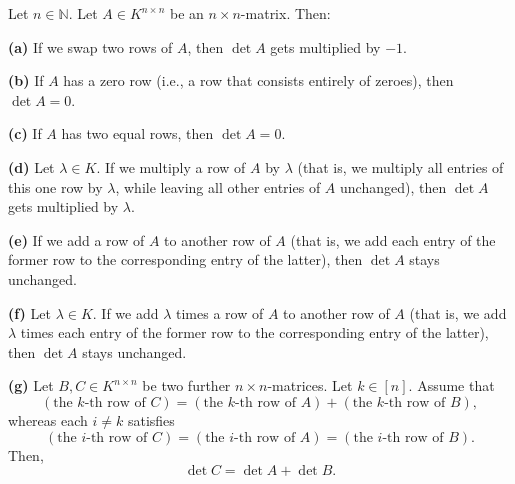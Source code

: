 \begin{theorem}
\label{thm.det.rowop}Let $n\in\mathbb{N}$. Let $A\in
K^{n\times n}$ be an $n\times n$-matrix. Then: \medskip

\textbf{(a)} If we swap two rows of $A$, then $\det A$ gets multiplied by
$-1$. \medskip

\textbf{(b)} If $A$ has a zero row (i.e., a row that consists entirely of
zeroes), then $\det A=0$. \medskip

\textbf{(c)} If $A$ has two equal rows, then $\det A=0$. \medskip

\textbf{(d)} Let $\lambda\in K$. If we multiply a row of $A$ by $\lambda$
(that is, we multiply all entries of this one row by $\lambda$, while leaving
all other entries of $A$ unchanged), then $\det A$ gets multiplied by
$\lambda$. \medskip

\textbf{(e)} If we add a row of $A$ to another row of $A$ (that is, we add
each entry of the former row to the corresponding entry of the latter), then
$\det A$ stays unchanged. \medskip

\textbf{(f)} Let $\lambda\in K$. If we add $\lambda$ times a row of $A$ to
another row of $A$ (that is, we add $\lambda$ times each entry of the former
row to the corresponding entry of the latter), then $\det A$ stays unchanged.
\medskip

\textbf{(g)} Let $B,C\in K^{n\times n}$ be two further $n\times n$-matrices.
Let $k\in\left[  n\right]  $. Assume that%
\[
\left(  \text{the }k\text{-th row of }C\right)  =\left(  \text{the }k\text{-th
row of }A\right)  +\left(  \text{the }k\text{-th row of }B\right)  ,
\]
whereas each $i\neq k$ satisfies%
\[
\left(  \text{the }i\text{-th row of }C\right)  =\left(  \text{the }i\text{-th
row of }A\right)  =\left(  \text{the }i\text{-th row of }B\right)  .
\]
Then,%
\[
\det C=\det A+\det B.
\]

\end{theorem}

